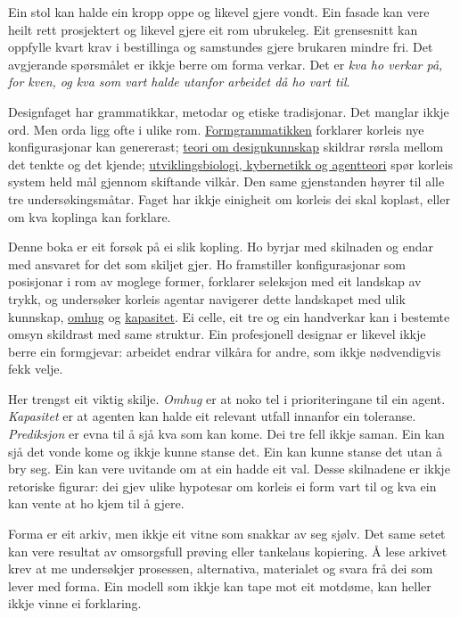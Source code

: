\begin{widebody}
\begin{foreordbody}
Ein stol kan halde ein kropp oppe og likevel gjere vondt. Ein fasade kan vere heilt rett prosjektert og likevel gjere eit rom ubrukeleg. Eit grensesnitt kan oppfylle kvart krav i bestillinga og samstundes gjere brukaren mindre fri. Det avgjerande spørsmålet er ikkje berre om forma verkar. Det er \textit{kva ho verkar på, for kven, og kva som vart halde utanfor arbeidet då ho vart til}.

Designfaget har grammatikkar, metodar og etiske tradisjonar. Det manglar ikkje ord. Men orda ligg ofte i ulike rom. \hyperlink{kjeldenotat-intro-1}{Formgrammatikken} forklarer korleis nye konfigurasjonar kan genererast; \hyperlink{kjeldenotat-intro-2}{teori om designkunnskap} skildrar rørsla mellom det tenkte og det kjende; \hyperlink{kjeldenotat-intro-3}{utviklingsbiologi, kybernetikk og agentteori} spør korleis system held mål gjennom skiftande vilkår. Den same gjenstanden høyrer til alle tre undersøkingsmåtar. Faget har ikkje einigheit om korleis dei skal koplast, eller om kva koplinga kan forklare.

Denne boka er eit forsøk på ei slik kopling. Ho byrjar med skilnaden og endar med ansvaret for det som skiljet gjer. Ho framstiller konfigurasjonar som posisjonar i rom av moglege former, forklarer seleksjon med eit landskap av trykk, og undersøker korleis agentar navigerer dette landskapet med ulik kunnskap, \hyperlink{kjeldenotat-intro-4}{omhug} og \hyperlink{kjeldenotat-intro-5}{kapasitet}. Ei celle, eit tre og ein handverkar kan i bestemte omsyn skildrast med same struktur. Ein profesjonell designar er likevel ikkje berre ein formgjevar: arbeidet endrar vilkåra for andre, som ikkje nødvendigvis fekk velje.

Her trengst eit viktig skilje. \textit{Omhug} er at noko tel i prioriteringane til ein agent. \textit{Kapasitet} er at agenten kan halde eit relevant utfall innanfor ein toleranse. \textit{Prediksjon} er evna til å sjå kva som kan kome. Dei tre fell ikkje saman. Ein kan sjå det vonde kome og ikkje kunne stanse det. Ein kan kunne stanse det utan å bry seg. Ein kan vere uvitande om at ein hadde eit val. Desse skilnadene er ikkje retoriske figurar: dei gjev ulike hypotesar om korleis ei form vart til og kva ein kan vente at ho kjem til å gjere.

Forma er eit arkiv, men ikkje eit vitne som snakkar av seg sjølv. Det same setet kan vere resultat av omsorgsfull prøving eller tankelaus kopiering. Å lese arkivet krev at me undersøkjer prosessen, alternativa, materialet og svara frå dei som lever med forma. Ein modell som ikkje kan tape mot eit motdøme, kan heller ikkje vinne ei forklaring.


\end{foreordbody}
\end{widebody}
